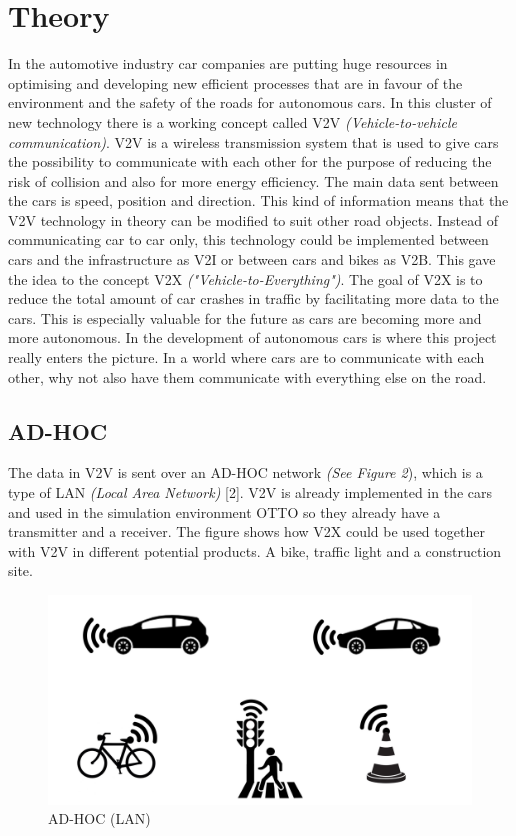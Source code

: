 \section{Theory}

In the automotive industry car companies are putting huge resources in optimising and developing new efficient processes that are in favour of the environment and the safety of the roads for autonomous cars. In this cluster of new technology there is a working concept called V2V \textit{(Vehicle-to-vehicle communication)}. V2V is a wireless transmission system that is used to give cars the possibility to communicate with each other for the purpose of reducing the risk of collision and also for more energy efficiency. The main data sent between the cars is speed, position and direction. This kind of information means that the V2V technology in theory can be modified to suit other road objects. Instead of communicating car to car only, this technology could be implemented between cars and the infrastructure as V2I or between cars and bikes as V2B. This gave the idea to the concept V2X \textit{("Vehicle-to-Everything")}. The goal of V2X is to reduce the total amount of car crashes in traffic by facilitating more data to the cars. This is especially valuable for the future as cars are becoming more and more autonomous. In the development of autonomous cars is where this project really enters the picture. In a world where cars are to communicate with each other, why not also have them communicate with everything else on the road.

\subsection{AD-HOC}
The data in V2V is sent over an AD-HOC network \textit{(See Figure 2}), which is a type of LAN \textit{(Local Area Network)} [2]. V2V is already implemented in the cars and used in the simulation environment OTTO so they already have a transmitter and a receiver. The figure shows how V2X could be used together with V2V in different potential products. A bike, traffic light and a construction site.

\begin{figure}[H]
    \centering
    \includegraphics[scale=0.4]{images/projektsketch2.jpg}
    \caption{AD-HOC (LAN)}
\end{figure}

